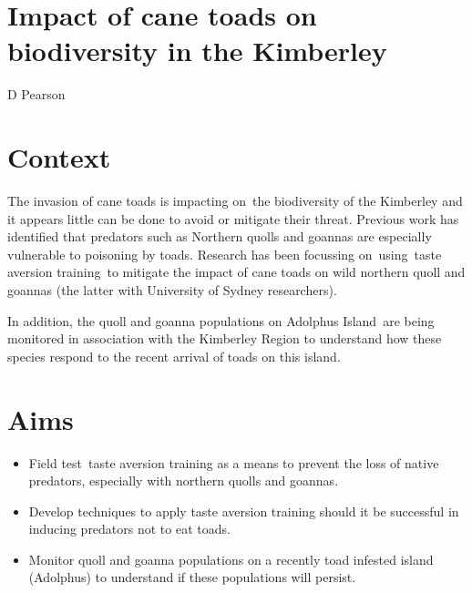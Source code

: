 \documentclass[version=last,
    paper=a4, %
    10pt, %
    usenames,
    dvipsnames,
    oneside, %
    headings=openany, %
    DIV=15 %
]{scrbook}
\begin{document}
\section*{Impact of cane toads on biodiversity in the Kimberley
}

D Pearson


\section*{Context}
The invasion of cane toads is impacting on~the biodiversity of the
Kimberley and it appears little can be done to avoid or mitigate their
threat. Previous work has identified that predators such as Northern
quolls and goannas are especially vulnerable to poisoning by toads.
Research has been focussing on~using~taste aversion training~to mitigate
the impact of cane toads on wild northern quoll and goannas (the latter
with University of Sydney researchers).

In addition, the quoll and goanna populations on Adolphus Island~are
being monitored in association with the Kimberley Region to understand
how these species respond to the recent arrival of toads on this island.



\section*{Aims}
\begin{itemize}
\itemsep1pt\parskip0pt
\item
  Field test~taste aversion training as a means to prevent the loss of
  native predators, especially with northern quolls and goannas.
\item
  Develop techniques to apply taste aversion training should it be
  successful in inducing predators not to eat toads.
\item
  Monitor quoll and goanna populations on a recently toad infested
  island (Adolphus) to understand if these populations will persist.
\end{itemize}
\end{document}
